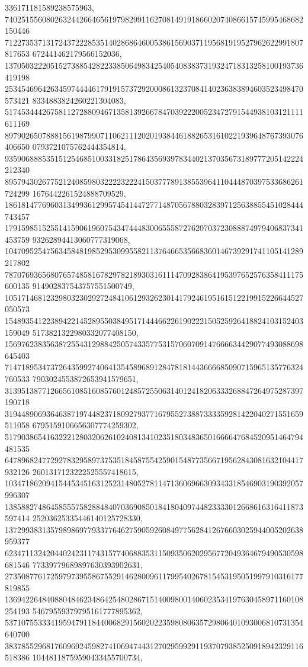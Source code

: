 \documentclass[12pt]{article}
\begin{document}
336171181589238575963, 
740251556080263244266465619798299116270814919186602074086615745995468682150446
712273537131724372228535140286864600538615690371195681919527962622991807817653
672441462179566152036, 
137050322205152738854282233850649834254054083837319324718313258100193736419198
253454696426345974444617919157372920008613237084140236383894603523498470573421
8334883824260221304083, 
517453444267581127288094671358139266784703922200523472791544938103121111611169
897902650788815619879907110621112020193844618826531610221939648767393076406650
0793721075762444354814, 
935906888535151254685100331825178643569397834402137035673189777205142224212340
895794302677521240859803222232224150377789138553964110444870397533686261724299
1676442261524888709529, 
186181477696031349936129957454144727714870567880328397125638855451028444743457
179159851525514159061960754347444830065558727620703723088874979406837341453759
93262894413060777319068, 
104709525475634584819852953099558211376466535668360146739291741105141289217802
787076936568076574858167829782189303161114709283864195397652576358411175600135
914902837543757551500749, 
105171468123298032302927248410612932623014179246195161512219915226644527050573
154893541223894221452895503849517144466226190222150525926418824103152403159049
5173821322980332077408150, 
156976238356387255431298842505743357753157060709147666634429077493088698645403
714718953473726435992740641354589689128478181443666685090715965135776324760533
7903024553872653941579651, 
313951387712665610851608576012485725506314012418206333268847264975287397190718
319448906936463871974482371809279377167955273887333359281422040271551659511058
6795159106656307774259302, 
517903865416322212803206261024081341023518034836501666647684520951464794481535
647896824772927832958973753518458755425901548773566719562843081632104417932126
2601317123222525557418615, 
103471862094154453451631252314805278114713606966309343318546903190392057996307
138588274864585557582884840703690850184180409744823333012668616316411873597414
25203625335446140125728330, 
137299383135798986977933776462759059260849775628412676603025944005202638959377
623471132420440242311743157740688353115093506202956772049364679490530598681546
77339779689897630393902631, 
273508776172597973955867552914628009611799540267815453195051997910316177819855
136942264840880484623486425480286715140098001406023534197630458971160108254193
54679559379795161777895362, 
537107553334195947911844006829156020223598080635729806401093006810731354640700
383785529681760969245982741069474431270295992911937079385250918942329116518386
10448118759590433455700734, 
\end{document}
